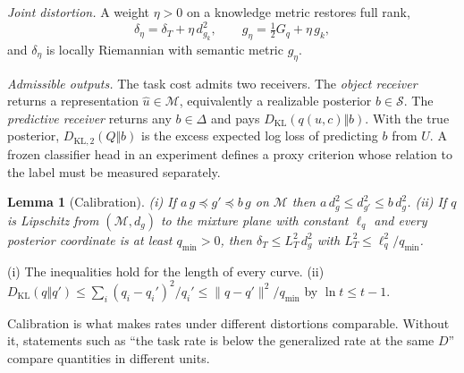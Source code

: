 \documentclass[10pt,journal]{IEEEtran}
\newtheorem{lemma}{Lemma}
\newcommand{\M}{\mathcal M}
\newcommand{\Sset}{\mathcal S}
\newcommand{\KL}{D_{\mathrm{KL}}}
\newcommand{\KLb}{D_{\mathrm{KL},2}}
\begin{document}
\emph{Joint distortion.} A weight $\eta>0$ on a knowledge metric restores full rank,
\begin{equation}
 \delta_\eta=\delta_T+\eta\,d_{g_k}^2,\qquad g_\eta=\tfrac12G_q+\eta\,g_k , \label{eq:joint}
\end{equation}
and $\delta_\eta$ is locally Riemannian with semantic metric $g_\eta$.

\emph{Admissible outputs.} The task cost admits two receivers. The \emph{object receiver} returns a representation $\hat u\in\M$, equivalently a realizable posterior $b\in\Sset$. The \emph{predictive receiver} returns any $b\in\Delta$ and pays $\KL(q(u,c)\Vert b)$. With the true posterior, $\KLb(Q\Vert b)$ is the excess expected log loss of predicting $b$ from $U$. A frozen classifier head in an experiment defines a proxy criterion whose relation to the label must be measured separately.
\begin{lemma}[Calibration]\label{lem:calib}
(i) If $a\,g\preceq g'\preceq b\,g$ on $\M$ then $a\,d_g^2\le d_{g'}^2\le b\,d_g^2$. (ii) If $q$ is Lipschitz from $(\M,d_g)$ to the mixture plane with constant $\ell_q$ and every posterior coordinate is at least $q_{\min}>0$, then $\delta_T\le L_T^2\,d_g^2$ with $L_T^2\le\ell_q^2/q_{\min}$.
\end{lemma}
\begin{IEEEproof}
(i) The inequalities hold for the length of every curve. (ii) $\KL(q\Vert q')\le\sum_i(q_i-q_i')^2/q_i'\le\|q-q'\|^2/q_{\min}$ by $\ln t\le t-1$.
\end{IEEEproof}
Calibration is what makes rates under different distortions comparable. Without it, statements such as ``the task rate is below the generalized rate at the same $D$'' compare quantities in different units.
\end{document}
